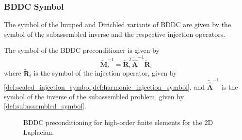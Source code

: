 \documentclass[review]{siamart190516}
\begin{document}
\subsubsection{BDDC Symbol}\label{sec:lfabddcsymbol}

The symbol of the lumped and Dirichled variants of BDDC are given by the symbol of the subassembled inverse and the respective injection operators.

\begin{definition}\label{def:bddc_symbol}
The symbol of the BDDC preconditioner is given by
\begin{equation}
\tilde{\mathbf{M}}^{-1}_i = \tilde{\mathbf{R}}^T_i \tilde{\hat{\mathbf{A}}}^{-1} \tilde{\mathbf{R}}_i
\end{equation}
where $\tilde{\mathbf{R}}_i$ is the symbol of the injection operator, given by \cref{def:scaled_injection_symbol,def:harmonic_injection_symbol}, and $\tilde{\hat{\mathbf{A}}}^{-1}$ is the symbol of the inverse of the subassembled problem, given by \cref{def:subassembled_symbol}.
\end{definition}

\begin{figure}[!tbp]
  \centering
  \hfill
  \caption{BDDC preconditioning for high-order finite elements for the 2D Laplacian.}
\end{figure}
\end{document}
